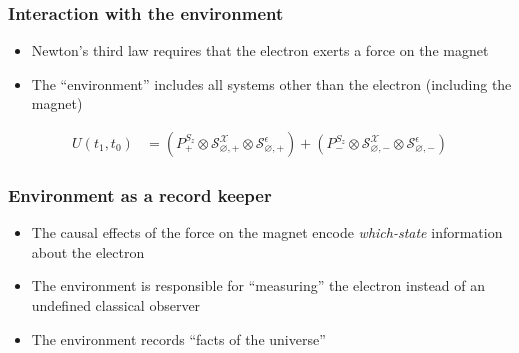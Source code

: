 \documentclass{beamer}
\newcommand{\apparatus}[4]{\node[square node] (#1) at (#2,#3){#4};
                             \node[port] (#1+) at (#2 + 0.375, #3 + 0.5){+};
                             \node[port] (#1-) at (#2 + 0.375, #3 - 0.5){-};}
\begin{document}
\begin{frame}
  \frametitle{Interaction with the environment}
  \begin{itemize}
    \item Newton's third law requires that the electron exerts a force on the magnet
    \item The ``environment'' includes all systems other than the electron (including the magnet)
  \end{itemize}
  \begin{figure}
  \end{figure}

  \begin{align*}
  U(t_1, t_0) &= \left(P^{S_z}_+ \otimes \mathcal{S}^\mathcal{X}_{\varnothing, +} \otimes \mathcal{S}^\epsilon_{\varnothing, +} \right) + \left(P^{S_z}_- \otimes \mathcal{S}^\mathcal{X}_{\varnothing, -} \otimes \mathcal{S}^\epsilon_{\varnothing, -} \right)
\end{align*}


\end{frame}

\begin{frame}
  \frametitle{Environment as a record keeper}
  \begin{itemize}
    \item The causal effects of the force on the magnet encode \textit{which-state} information about the electron
    \item The environment is responsible for ``measuring'' the electron instead of an undefined classical observer
    \item The environment records ``facts of the universe''
  \end{itemize}
\end{frame}
\end{document}
